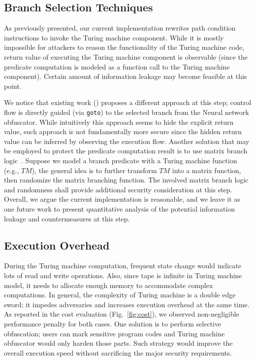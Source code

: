 \documentclass[lnicst]{svmultln}
\begin{document}
\subsection{Branch Selection Techniques}
As previously presented, our current implementation rewrites path condition
instructions to invoke the Turing machine component. While it is mostly
impossible for attackers to reason the functionality of the Turing machine code,
return value of executing the Turing machine component is observable (since the
predicate computation is modeled as a function call to the Turing machine
component). Certain amount of information leakage may become feasible at this
point.

We notice that existing work (\cite{Ma, Maieee}) proposes a different approach
at this step; control flow is directly guided (via \texttt{goto}) to the
selected branch from the Neural network obfuscator. While intuitively this
approach seems to hide the explicit return value, such approach is not
fundamentally more secure since the hidden return value can be inferred by
observing the execution flow. Another solution that may be employed to protect
the predicate computation result is to use matrix branch logic~\cite{Samjam}.
Suppose we model a branch predicate with a Turing machine function (e.g., $TM$),
the general idea is to further transform $TM$ into a matrix function, then
randomize the matrix branching function. The involved matrix branch logic and
randomness shall provide additional security consideration at this step.
Overall, we argue the current implementation is reasonable, and we leave it as
one future work to present quantitative analysis of the potential information
leakage and countermeasures at this step.

\subsection{Execution Overhead}
During the Turing machine computation, frequent state change would indicate lots
of read and write operations. Also, since tape is infinite in Turing machine
model, it needs to allocate enough memory to accommodate complex computations.
In general, the complexity of Turing machine is a double edge sword; it impedes
adversaries and increases execution overhead at the same time. As reported in
the cost evaluation (Fig.~\ref{fig:cost}), we observed non-negligible
performance penalty for both cases. One solution is to perform selective
obfuscation; users can mark sensitive program codes and Turing machine
obfuscator would only harden those parts. Such strategy would improve the
overall execution speed without sacrificing the major security requirements.
\end{document}
